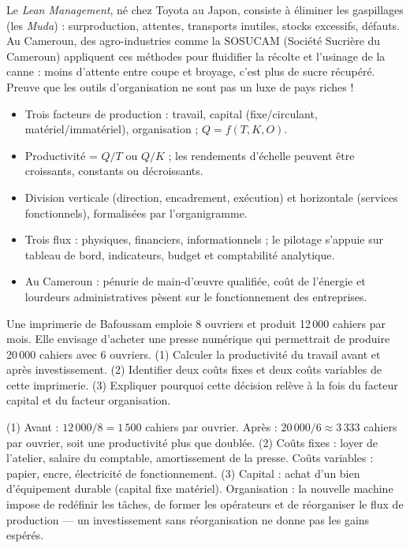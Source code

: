 \documentclass[11pt]{article}
\newcommand{\cle}[1]{{\popxbold\color{popdark}#1}}
\begin{document}
\begin{savaistu}
Le \emph{Lean Management}, né chez Toyota au Japon, consiste à éliminer les gaspillages (les \emph{Muda}) : surproduction, attentes, transports inutiles, stocks excessifs, défauts. Au Cameroun, des agro-industries comme la SOSUCAM (Société Sucrière du Cameroun) appliquent ces méthodes pour fluidifier la récolte et l'usinage de la canne : moins d'attente entre coupe et broyage, c'est plus de sucre récupéré. Preuve que les outils d'organisation ne sont pas un luxe de pays riches !
\end{savaistu}

\begin{aretenir}
\begin{itemize}
\item Trois facteurs de production : \cle{travail}, \cle{capital} (fixe/circulant, matériel/immatériel), \cle{organisation} ; $Q = f(T, K, O)$.
\item Productivité = $Q/T$ ou $Q/K$ ; les rendements d'échelle peuvent être croissants, constants ou décroissants.
\item Division verticale (direction, encadrement, exécution) et horizontale (services fonctionnels), formalisées par l'organigramme.
\item Trois flux : physiques, financiers, informationnels ; le pilotage s'appuie sur tableau de bord, indicateurs, budget et comptabilité analytique.
\item Au Cameroun : pénurie de main-d'œuvre qualifiée, coût de l'énergie et lourdeurs administratives pèsent sur le fonctionnement des entreprises.
\end{itemize}
\end{aretenir}

\begin{exercice}[Application]
Une imprimerie de Bafoussam emploie 8 ouvriers et produit 12\,000 cahiers par mois. Elle envisage d'acheter une presse numérique qui permettrait de produire 20\,000 cahiers avec 6 ouvriers. (1) Calculer la productivité du travail avant et après investissement. (2) Identifier deux coûts fixes et deux coûts variables de cette imprimerie. (3) Expliquer pourquoi cette décision relève à la fois du facteur capital et du facteur organisation.
\end{exercice}

\begin{corrige}[Exercice 1]
(1) Avant : $12\,000/8 = 1\,500$ cahiers par ouvrier. Après : $20\,000/6 \approx 3\,333$ cahiers par ouvrier, soit une productivité plus que doublée.
(2) Coûts fixes : loyer de l'atelier, salaire du comptable, amortissement de la presse. Coûts variables : papier, encre, électricité de fonctionnement.
(3) Capital : achat d'un bien d'équipement durable (capital fixe matériel). Organisation : la nouvelle machine impose de redéfinir les tâches, de former les opérateurs et de réorganiser le flux de production — un investissement sans réorganisation ne donne pas les gains espérés.
\end{corrige}
\end{document}
